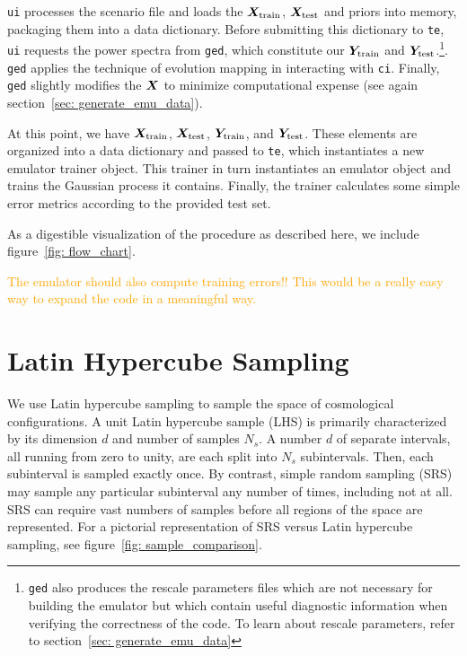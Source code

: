 \texttt{ui} processes the scenario file and loads the
$\bm{X}_\text{train}$, $\bm{X}_\text{test}$
and priors into
memory, packaging them into a data dictionary. Before submitting this
dictionary to \texttt{te}, \texttt{ui} requests the power spectra from
\texttt{ged}, which constitute our $\bm{Y}_\text{train}$ and
$\bm{Y}_\text{test}$.\footnote{\texttt{ged} also 
produces the rescale parameters files which are not
necessary for building the emulator but which contain useful diagnostic
information when verifying the correctness of the code. To learn about rescale
parameters, refer to section~\ref{sec: generate_emu_data}}. \texttt{ged}
applies the technique of evolution mapping in interacting with \texttt{ci}.
Finally, \texttt{ged} slightly modifies the $\bm{X}$ to minimize
computational expense (see again section~\ref{sec: generate_emu_data}). 

At this point, we have $\bm{X}_\text{train}$, $\bm{X}_\text{test}$, 
$\bm{Y}_\text{train}$, and $\bm{Y}_\text{test}$. These elements are
organized into a data dictionary and passed to \texttt{te}, which instantiates
a new emulator trainer object. This trainer in turn instantiates an emulator 
object and trains the Gaussian process it contains. Finally, the trainer 
calculates some simple error metrics according to the provided test set.

As a digestible visualization of the procedure as described here, we
include figure~\ref{fig: flow_chart}.

\textcolor{orange}{The emulator should also compute training errors!! This
would be a really easy way to expand the code in a meaningful way.}

\section{Latin Hypercube Sampling}
\label{sec: lhc}

We use Latin hypercube sampling to sample 
the space of cosmological configurations.
A unit Latin hypercube sample (LHS) is primarily characterized by its 
dimension $d$ and number of samples $N_s$. A number $d$ of separate intervals, 
all running from zero to unity, are
each split into $N_s$ subintervals. Then, each subinterval is sampled
exactly once. By contrast, simple random sampling (SRS) may sample any 
particular subinterval any number of times, including not at all. SRS
can require vast numbers of samples before all regions of the space are
represented. For a pictorial representation of SRS versus Latin hypercube
sampling, see figure~\ref{fig: sample_comparison}.

